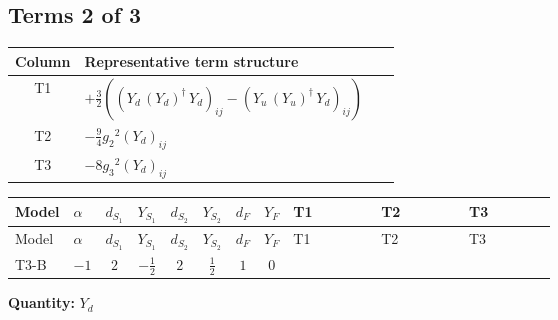 \documentclass[8pt]{article}
\begin{document}
\begin{landscape}
\subsection*{Terms 2 of 3}
\begin{center}
\begin{tabular}{@{}c >{\raggedright\arraybackslash}p{0.82\linewidth}@{}}
\toprule
Column & Representative term structure \\
\midrule
T1 & \(\displaystyle +\frac{3}{2} (\left({Y_d}\,\left({Y_d}\right)^{\dagger}\,{Y_d}\right)_{ij}-\left({Y_u}\,\left({Y_u}\right)^{\dagger}\,{Y_d}\right)_{ij})\) \\
\midrule
T2 & \(\displaystyle -\frac{9}{4} {g_2}^2 \left({Y_d}\right)_{ij}\) \\
\midrule
T3 & \(\displaystyle -8 {g_3}^2 \left({Y_d}\right)_{ij}\) \\
\midrule
\bottomrule
\end{tabular}
\end{center}
\smallskip
\tiny
\begin{longtable}{@{}llcccccc >{\raggedright\arraybackslash}p{0.21\linewidth} >{\raggedright\arraybackslash}p{0.21\linewidth} >{\raggedright\arraybackslash}p{0.21\linewidth}@{}}
\toprule
Model & $\alpha$ & $d_{S_1}$ & $Y_{S_1}$ & $d_{S_2}$ & $Y_{S_2}$ & $d_F$ & $Y_F$ & T1 & T2 & T3 \\
\midrule
\endfirsthead
\toprule
Model & $\alpha$ & $d_{S_1}$ & $Y_{S_1}$ & $d_{S_2}$ & $Y_{S_2}$ & $d_F$ & $Y_F$ & T1 & T2 & T3 \\
\midrule
\endhead
T3-B & $-1$ & $2$ & $-\frac{1}{2}$ & $2$ & $\frac{1}{2}$ & $1$ & $0$ & \scriptsize\adjustbox{max width=\linewidth}{$\begin{gathered} +\frac{3}{2} (\left({Y_d}\,\left({Y_d}\right)^{\dagger}\,{Y_d}\right)_{ij}-\left({Y_u}\,\left({Y_u}\right)^{\dagger}\,{Y_d}\right)_{ij})\end{gathered}$} & \scriptsize\adjustbox{max width=\linewidth}{$\begin{gathered} -\frac{9}{4} {g_2}^2 \left({Y_d}\right)_{ij}\end{gathered}$} & \scriptsize\adjustbox{max width=\linewidth}{$\begin{gathered} -8 {g_3}^2 \left({Y_d}\right)_{ij}\end{gathered}$} \\
\midrule
\bottomrule
\end{longtable}
\clearpage
\noindent\textbf{Quantity: }$Y_d$\par\smallskip

\end{landscape}
\end{document}
